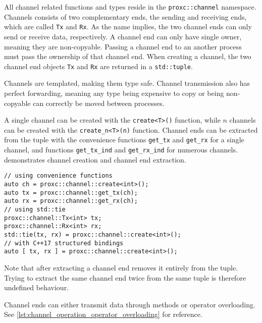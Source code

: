 All channel related functions and types reside in the \lstinline[style={CustomC++}]|proxc::channel| namespace. Channels consists of two complementary ends, the sending and receiving ends, which are called \lstinline[style={CustomC++}]|Tx| and \lstinline[style={CustomC++}]|Rx|. As the name implies, the two channel ends can only send or receive data, respectively. A channel end can only have single owner, meaning they are non\hyp{}copyable. Passing a channel end to an another process must pass the ownership of that channel end. When creating a channel, the two channel end objects \lstinline[style={CustomC++}]|Tx| and \lstinline[style={CustomC++}]|Rx| are returned in a \lstinline[style={CustomC++}]|std::tuple|.

Channels are templated, making them type safe. Channel transmission also has perfect forwarding, meaning any type being expensive to copy or being non\hyp{}copyable can correctly be moved between processes.

A single channel can be created with the \lstinline[style={CustomC++}]|create<T>()| function, while $n$ channels can be created with the \lstinline[style={CustomC++}]|create_n<T>(n)| function. Channel ends can be extracted from the tuple with the convenience functions \lstinline[style={CustomC++}]|get_tx| and \lstinline[style={CustomC++}]|get_rx| for a single channel, and functions \lstinline[style={CustomC++}]|get_tx_ind| and \lstinline[style={CustomC++}]|get_rx_ind| for numerous channels.  demonstrates channel creation and channel end extraction.

\begin{lstfloat}
\begin{lstlisting}[caption={Channel creation and channel end extraction.}, label={lst:channel_creation}, style={CustomC++}]
// using convenience functions
auto ch = proxc::channel::create<int>();
auto tx = proxc::channel::get_tx(ch);
auto rx = proxc::channel::get_rx(ch);
// using std::tie
proxc::channel::Tx<int> tx;
proxc::channel::Rx<int> rx;
std::tie(tx, rx) = proxc::channel::create<int>();
// with C++17 structured bindings
auto [ tx, rx ] = proxc::channel::create<int>();
\end{lstlisting}
\end{lstfloat}

Note that after extracting a channel end removes it entirely from the tuple. Trying to extract the same channel end twice from the same tuple is therefore undefined behaviour. 

Channel ends can either transmit data through methods or operator overloading. See \cref{lst:channel_operation_operator_overloading} for reference.

